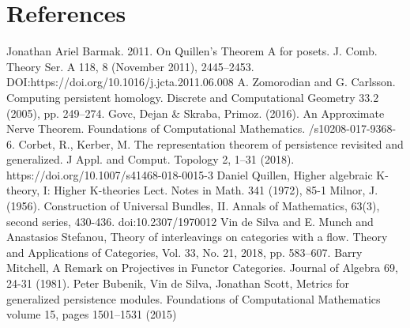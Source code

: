 \documentclass[a4paper, 12pt]{article}
\numberwithin{equation}{section}
\theoremstyle{definition}
\theoremstyle{remark}
\begin{document}
\section{References}

\begin{enumerate}
  Jonathan Ariel Barmak. 2011.
  \newblock On Quillen’s Theorem A for posets.
  \newblock J. Comb. Theory Ser. A 118, 8 (November 2011), 2445–2453.
  \newblock DOI:https://doi.org/10.1016/j.jcta.2011.06.008
  A. Zomorodian and G. Carlsson.
  \newblock Computing persistent homology.
  \newblock Discrete and Computational Geometry 33.2 (2005), pp. 249–274.
  Govc, Dejan \& Skraba, Primoz. (2016).
  \newblock An Approximate Nerve Theorem.
  \newblock Foundations of Computational Mathematics.
  /s10208-017-9368-6.
  Corbet, R., Kerber, M.
  \newblock The representation theorem of persistence revisited and generalized.
  \newblock J Appl. and Comput. Topology 2, 1–31 (2018).
  \newblock https://doi.org/10.1007/s41468-018-0015-3
  Daniel Quillen,
  \newblock Higher algebraic K-theory, I: Higher K-theories Lect.
  \newblock Notes in Math. 341 (1972), 85-1
  Milnor, J. (1956).
  \newblock Construction of Universal Bundles, II.
  \newblock Annals of Mathematics, 63(3), second series, 430-436.
  \newblock doi:10.2307/1970012
  Vin de Silva and E. Munch and Anastasios Stefanou,
  \newblock Theory of interleavings on categories with a flow.
  \newblock Theory and Applications of Categories, Vol. 33, No. 21, 2018, pp. 583–607.
  Barry Mitchell,
  \newblock A Remark on Projectives in Functor Categories.
  \newblock Journal of Algebra 69, 24-31 (1981).
  Peter Bubenik, Vin de Silva, Jonathan Scott,
  \newblock Metrics for generalized persistence modules.
  \newblock Foundations of Computational Mathematics volume 15, pages 1501–1531 (2015)
\end{enumerate}
\end{document}
